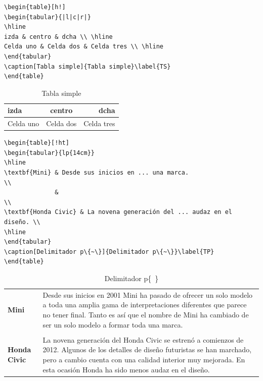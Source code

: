\documentclass[10pt,a4paper]{article}
\begin{document}
\begin{table}[h!]
\begin{minipage}{0.6\textwidth}
\begin{verbatim}
\begin{table}[h!]
\begin{tabular}{|l|c|r|}
\hline
izda & centro & dcha \\ \hline
Celda uno & Celda dos & Celda tres \\ \hline
\end{tabular}
\caption[Tabla simple]{Tabla simple}\label{TS}
\end{table}
\end{verbatim}
\end{minipage}
\begin{minipage}{0.4\textwidth}
\begin{tabular}{|l|c|r|}
\hline
izda & centro & dcha \\ \hline
Celda uno & Celda dos & Celda tres \\ \hline
\end{tabular}
\caption[Tabla simple]{Tabla simple}\label{TS}
\end{minipage}
\end{table}

\bigskip


\begin{verbatim}
\begin{table}[!ht]
\begin{tabular}{lp{14cm}}
\hline
\textbf{Mini} & Desde sus inicios en ... una marca.                     \\
              &                                                         \\
\textbf{Honda Civic} & La novena generación del ... audaz en el diseño. \\
\hline
\end{tabular}
\caption[Delimitador p\{~\}]{Delimitador p\{~\}}\label{TP}
\end{table}
\end{verbatim}

\bigskip

\begin{table}[!ht]
\begin{tabular}{lp{12cm}}
\hline
\textbf{Mini} & Desde sus inicios en 2001 Mini ha pasado de ofrecer un solo modelo a toda una amplia gama de interpretaciones diferentes que parece no tener final. Tanto es así que el nombre de Mini ha cambiado de ser un solo modelo a formar toda una marca.  \\
& \\
\textbf{Honda Civic} & La novena generación del Honda Civic se estrenó a comienzos de 2012. Algunos de los detalles de diseño futuristas se han marchado, pero a cambio cuenta con una calidad interior muy mejorada. En esta ocasión Honda ha sido menos audaz en el diseño. \\
\hline
\end{tabular}
\caption[Delimitador p\{~\}]{Delimitador p\{~\}}\label{TP}
\end{table}
\end{document}
